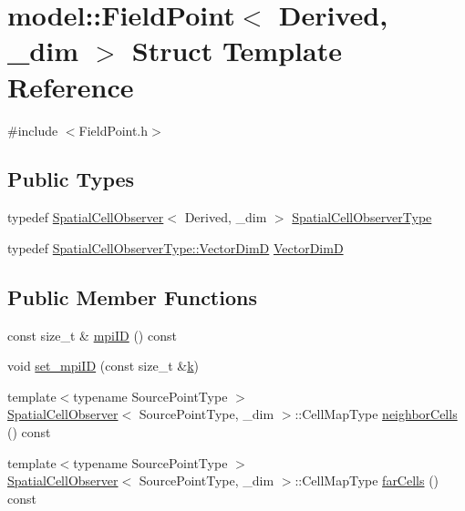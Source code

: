 \hypertarget{structmodel_1_1_field_point_3_01_derived_00_01__dim_01_4}{}\section{model\+:\+:Field\+Point$<$ Derived, \+\_\+dim $>$ Struct Template Reference}
\label{structmodel_1_1_field_point_3_01_derived_00_01__dim_01_4}


{\ttfamily \#include $<$Field\+Point.\+h$>$}

\subsection*{Public Types}
\begin{DoxyCompactItemize}
\item 
typedef \hyperlink{structmodel_1_1_spatial_cell_observer}{Spatial\+Cell\+Observer}$<$ Derived, \+\_\+dim $>$ \hyperlink{structmodel_1_1_field_point_3_01_derived_00_01__dim_01_4_aeb51cce408ee0ca3a456271e7ecb0242}{Spatial\+Cell\+Observer\+Type}
\item 
typedef \hyperlink{structmodel_1_1_spatial_cell_observer_a9b73220477f451fa7981e2597f23614b}{Spatial\+Cell\+Observer\+Type\+::\+Vector\+Dim\+D} \hyperlink{structmodel_1_1_field_point_3_01_derived_00_01__dim_01_4_a4e9a6c1b0d2872fc373a046bf048c37c}{Vector\+Dim\+D}
\end{DoxyCompactItemize}
\subsection*{Public Member Functions}
\begin{DoxyCompactItemize}
\item 
const size\+\_\+t \& \hyperlink{structmodel_1_1_field_point_3_01_derived_00_01__dim_01_4_a735f51987c075599c589b449ebf933d8}{mpi\+I\+D} () const 
\item 
void \hyperlink{structmodel_1_1_field_point_3_01_derived_00_01__dim_01_4_ae38d879c5b5c30f7621ce20073d9e7d9}{set\+\_\+mpi\+I\+D} (const size\+\_\+t \&\hyperlink{_f_e_m_2linear__elasticity__3d_2tetgen_2generate_p_o_l_ycube_8m_a5d2aad4440da75aa43f2643e72b1a3bd}{k})
\item 
{\footnotesize template$<$typename Source\+Point\+Type $>$ }\\\hyperlink{structmodel_1_1_spatial_cell_observer}{Spatial\+Cell\+Observer}$<$ Source\+Point\+Type, \+\_\+dim $>$\+::Cell\+Map\+Type \hyperlink{structmodel_1_1_field_point_3_01_derived_00_01__dim_01_4_a8397eb393af1df197f2ca1fec0b0e112}{neighbor\+Cells} () const 
\item 
{\footnotesize template$<$typename Source\+Point\+Type $>$ }\\\hyperlink{structmodel_1_1_spatial_cell_observer}{Spatial\+Cell\+Observer}$<$ Source\+Point\+Type, \+\_\+dim $>$\+::Cell\+Map\+Type \hyperlink{structmodel_1_1_field_point_3_01_derived_00_01__dim_01_4_a6b5c31d58b52421acc775f48a0116cbf}{far\+Cells} () const 
\end{DoxyCompactItemize}


